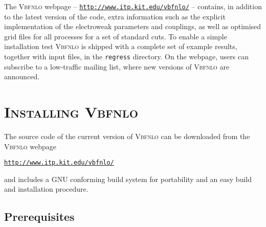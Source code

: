 \documentclass[english,12pt]{article}
\begin{document}
The \textsc{Vbfnlo} webpage -- 
\href{http://www.itp.kit.edu/vbfnlo/}{\tt http://www.itp.kit.edu/vbfnlo/} -- contains, in addition to
the latest version of the code, extra information such as the explicit
implementation of the electroweak parameters and couplings, as well as optimised
grid files for all processes for a set of standard cuts.  To enable a simple installation test
\textsc{Vbfnlo} is shipped with a complete set of example results, together
with input files, in the {\tt regress} directory.  On the webpage, users can subscribe to
a low-traffic mailing list, where new versions of \textsc{Vbfnlo} are announced.


\newpage

\section{\textsc{Installing Vbfnlo}}

The source code of the current version of \textsc{Vbfnlo} can be
downloaded from the \textsc{Vbfnlo} webpage
%
\begin{center}
\href{http://www.itp.kit.edu/vbfnlo/}{\tt http://www.itp.kit.edu/vbfnlo/}
\end{center}
%
and includes a GNU conforming build system for portability and an
easy build and installation procedure.

\subsection{Prerequisites}
\end{document}
